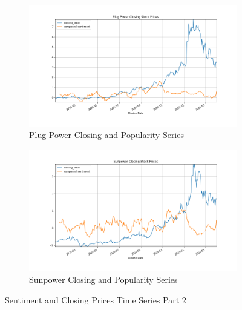 \documentclass[sigconf, nonacm]{acmart}
\begin{document}
\begin{figure}[H]
\centering
   \begin{subfigure}[b]{0.5\textwidth}
   \includegraphics[width=\textwidth]{sentiment_time_series/Plug Power Closing Stock Prices_closing_price_compound_sentiment.png} 
   \caption{Plug Power Closing and Popularity Series}
   \label{fig:Ng1} 
\end{subfigure}
\centering
   \begin{subfigure}[b]{0.5\textwidth}
   \includegraphics[width=\textwidth]{sentiment_time_series/Sunpower Closing Stock Prices_closing_price_compound_sentiment.png} 
   \caption{Sunpower Closing and Popularity Series}
   \label{fig:Ng1} 
\end{subfigure}
\caption{Sentiment and Closing Prices Time Series Part 2}
\end{figure}



\end{document}
